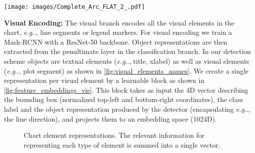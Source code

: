 \documentclass[runningheads]{llncs}
\makeatletter
\newcommand\our[1][]{CRCT\xspace}
\newcommand\ourFullname[1][]{Classification - Regression Chart Transformer (\our)\xspace}
\DeclareRobustCommand\onedot{\futurelet\@let@token\@onedot}
\def\@onedot{\ifx\@let@token.\else.\null\fi\xspace}
\def\eg{\emph{e.g}\onedot} \def\Eg{\emph{E.g}\onedot}
\makeatother
\begin{document}
\begin{figure*}[t]
\begin{center}
\texttt{[image: images/Complete\_Arc\_FLAT\_2\_.pdf]}
\end{center}
   \caption{Our \ourFullname  network architecture consists of two stages of detection and question answering. The detection stage (left) provides bounding boxes and object representations of the visual and textual elements (see Fig. \ref{fig:visual_elements_names}). These features, along with the question text, enable the co-transformers in the second stage (right) to fuse both visual and textual information into a pooled tuple of two single feature vectors . Next, our hybrid prediction head containing two different MLPs, outputs a classification score and a regression result. co/self: co/self attention.}
\label{fig:all_arc}
\end{figure*}

{\bf Visual Encoding:} The visual branch encodes all the visual elements in the chart, \eg, line segments or legend markers. For visual encoding we train a Mask-RCNN \cite{he2017mask} with a ResNet-50 \cite{he2015deep} backbone. Object representations are then extracted from the penultimate layer in the classification branch. In our detection scheme objects are textual elements (\eg, title, xlabel) as well as visual elements (\eg, plot segment) as shown in \cref{fig:visual_elements_names}.
We create a single representation per visual element by a learnable block as shown in \cref{fig:feature_embeddings_vis}. This block takes as input the 4D vector describing the bounding box (normalized top-left and bottom-right coordinates), the class label and the object representation produced by the detector (encapsulating \eg, the line direction), and projects them to an embedding space (1024D). 


\begin{figure}[t]\centering
    \hfill
    \caption{Chart element representations. The relevant information for representing each type of element is summed into a single vector.}
    \label{fig:feature_embeddings}
\end{figure}
\end{document}
